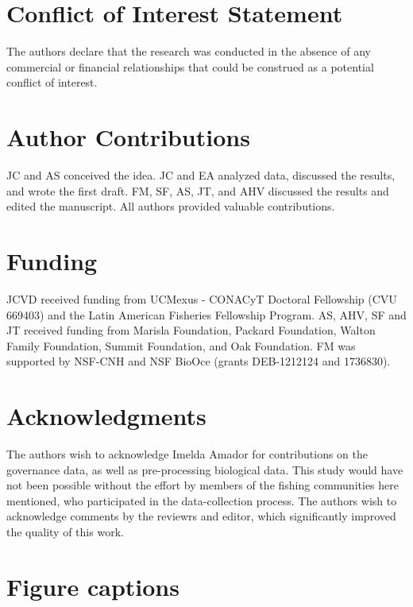 \documentclass{frontiersSCNS}
\begin{document}
\section*{Conflict of Interest Statement}

The authors declare that the research was conducted in the absence of
any commercial or financial relationships that could be construed as a
potential conflict of interest.

\section*{Author Contributions}

JC and AS conceived the idea. JC and EA analyzed data, discussed the
results, and wrote the first draft. FM, SF, AS, JT, and AHV discussed
the results and edited the manuscript. All authors provided valuable
contributions.

\section*{Funding}

JCVD received funding from UCMexus - CONACyT Doctoral Fellowship (CVU
669403) and the Latin American Fisheries Fellowship Program. AS, AHV, SF
and JT received funding from Marisla Foundation, Packard Foundation,
Walton Family Foundation, Summit Foundation, and Oak Foundation. FM was
supported by NSF-CNH and NSF BioOce (grants DEB-1212124 and 1736830).

\section*{Acknowledgments}

The authors wish to acknowledge Imelda Amador for contributions on the
governance data, as well as pre-processing biological data. This study
would have not been possible without the effort by members of the
fishing communities here mentioned, who participated in the
data-collection process. The authors wish to acknowledge comments by the
reviewrs and editor, which significantly improved the quality of this
work.

\clearpage




\clearpage

\section*{Figure captions}
\end{document}
